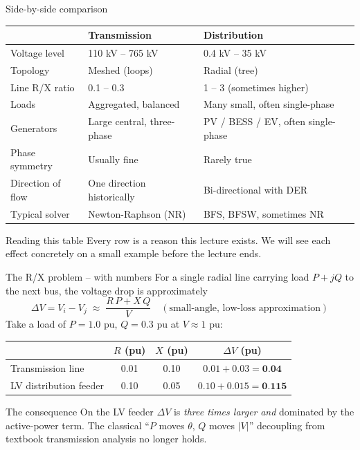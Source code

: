 \documentclass[aspectratio=169,10pt]{beamer}
\begin{document}
\begin{frame}{Side-by-side comparison}
\centering
\small
\begin{tabular}{lll}
\toprule
 & \textbf{Transmission} & \textbf{Distribution} \\
\midrule
Voltage level & 110 kV -- 765 kV & 0.4 kV -- 35 kV \\
Topology & Meshed (loops) & Radial (tree) \\
Line R/X ratio & 0.1 -- 0.3 & 1 -- 3 (sometimes higher) \\
Loads & Aggregated, balanced & Many small, often single-phase \\
Generators & Large central, three-phase & PV / BESS / EV, often single-phase \\
Phase symmetry & Usually fine & Rarely true \\
Direction of flow & One direction historically & Bi-directional with DER \\
Typical solver & Newton-Raphson (NR) & BFS, BFSW, sometimes NR \\
\bottomrule
\end{tabular}
\vspace{0.8em}
\begin{block}{Reading this table}
Every row is a reason this lecture exists. We will see each effect concretely on a small example before the lecture ends.
\end{block}
\end{frame}

\begin{frame}{The R/X problem -- with numbers}
For a single radial line carrying load $P + jQ$ to the next bus, the voltage drop is approximately
\begin{equation*}
\Delta V = V_i - V_j \;\approx\; \frac{R \, P + X \, Q}{V} \quad (\text{small-angle, low-loss approximation})
\end{equation*}
\vspace{0.3em}
Take a load of $P = 1.0$ pu, $Q = 0.3$ pu at $V \approx 1$ pu:
\vspace{0.3em}
\centering
\small
\begin{tabular}{lccc}
\toprule
 & $R$ (pu) & $X$ (pu) & $\Delta V$ (pu) \\
\midrule
Transmission line & 0.01 & 0.10 & $0.01 + 0.03 = \textbf{0.04}$ \\
LV distribution feeder & 0.10 & 0.05 & $0.10 + 0.015 = \textbf{0.115}$ \\
\bottomrule
\end{tabular}
\vspace{0.6em}
\begin{alertblock}{The consequence}
On the LV feeder $\Delta V$ is \emph{three times larger} \emph{and} dominated by the active-power term. The classical ``$P$ moves $\theta$, $Q$ moves $|V|$'' decoupling from textbook transmission analysis no longer holds.
\end{alertblock}
\end{frame}
\end{document}
